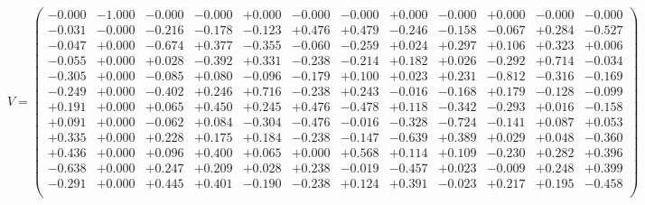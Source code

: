 \documentclass[9pt]{article}
\theoremstyle{plain}
\theoremstyle{definition}
\theoremstyle{remark}
\numberwithin{equation}{section}
\begin{document}
$V = \left(
\begin{array}{
cccccccccccc}
-0.000 & -1.000 & -0.000 & -0.000 & +0.000 & -0.000 & -0.000 & +0.000 & -0.000 & +0.000 & -0.000 & -0.000 \\
-0.031 & -0.000 & -0.216 & -0.178 & -0.123 & +0.476 & +0.479 & -0.246 & -0.158 & -0.067 & +0.284 & -0.527 \\
-0.047 & +0.000 & -0.674 & +0.377 & -0.355 & -0.060 & -0.259 & +0.024 & +0.297 & +0.106 & +0.323 & +0.006 \\
-0.055 & +0.000 & +0.028 & -0.392 & +0.331 & -0.238 & -0.214 & +0.182 & +0.026 & -0.292 & +0.714 & -0.034 \\
-0.305 & +0.000 & -0.085 & +0.080 & -0.096 & -0.179 & +0.100 & +0.023 & +0.231 & -0.812 & -0.316 & -0.169 \\
-0.249 & +0.000 & -0.402 & +0.246 & +0.716 & -0.238 & +0.243 & -0.016 & -0.168 & +0.179 & -0.128 & -0.099 \\
+0.191 & +0.000 & +0.065 & +0.450 & +0.245 & +0.476 & -0.478 & +0.118 & -0.342 & -0.293 & +0.016 & -0.158 \\
+0.091 & +0.000 & -0.062 & +0.084 & -0.304 & -0.476 & -0.016 & -0.328 & -0.724 & -0.141 & +0.087 & +0.053 \\
+0.335 & +0.000 & +0.228 & +0.175 & +0.184 & -0.238 & -0.147 & -0.639 & +0.389 & +0.029 & +0.048 & -0.360 \\
+0.436 & +0.000 & +0.096 & +0.400 & +0.065 & +0.000 & +0.568 & +0.114 & +0.109 & -0.230 & +0.282 & +0.396 \\
-0.638 & +0.000 & +0.247 & +0.209 & +0.028 & +0.238 & -0.019 & -0.457 & +0.023 & -0.009 & +0.248 & +0.399 \\
-0.291 & +0.000 & +0.445 & +0.401 & -0.190 & -0.238 & +0.124 & +0.391 & -0.023 & +0.217 & +0.195 & -0.458 \\
\end{array}
\right)$ \newline 
\end{document}

